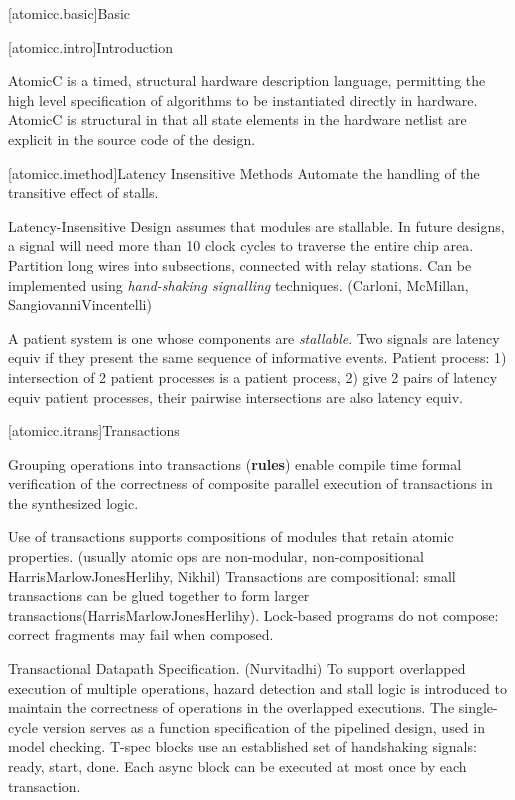 [atomicc.basic]{Basic}

[atomicc.intro]{Introduction}

AtomicC is a timed, structural hardware description language, permitting
the high level specification of algorithms to be instantiated
directly in hardware.
AtomicC is structural in that all state elements in the hardware
netlist are explicit in the source code of the design.

[atomicc.imethod]{Latency Insensitive Methods}
Automate the handling of the transitive effect of stalls.

Latency-Insensitive Design assumes that modules are stallable.
In future designs, a signal will need more than 10 clock cycles
to traverse the entire chip area.  Partition long wires into
subsections, connected with relay stations.
Can be implemented using \textit{hand-shaking signalling} techniques.
(Carloni, McMillan, SangiovanniVincentelli)

A patient system is one whose components are \textit{stallable}.
Two signals are latency equiv if they present the same sequence of
informative events.
Patient process: 1) intersection of 2 patient processes is a patient
process, 2) give 2 pairs of latency equiv patient processes,
their pairwise intersections are also latency equiv.

[atomicc.itrans]{Transactions}

Grouping operations into transactions (\textbf{rules})
enable compile time formal verification of the correctness of
composite parallel execution of transactions
in the synthesized logic.

Use of transactions supports compositions of modules that 
retain atomic properties.  (usually atomic ops are non-modular, non-compositional
HarrisMarlowJonesHerlihy, Nikhil)
Transactions are compositional: small transactions can be glued together to form 
larger transactions(HarrisMarlowJonesHerlihy).
Lock-based programs do not compose: correct fragments may fail when composed.

Transactional Datapath Specification.  (Nurvitadhi)
To support overlapped execution of multiple operations,
hazard detection and stall logic is introduced to maintain
the correctness of operations in the overlapped executions.
The single-cycle version serves as a function specification of the pipelined
design, used in model checking.
T-spec blocks use an established set of handshaking signals: ready, start, done.
Each async block can be executed at most once by each transaction.

